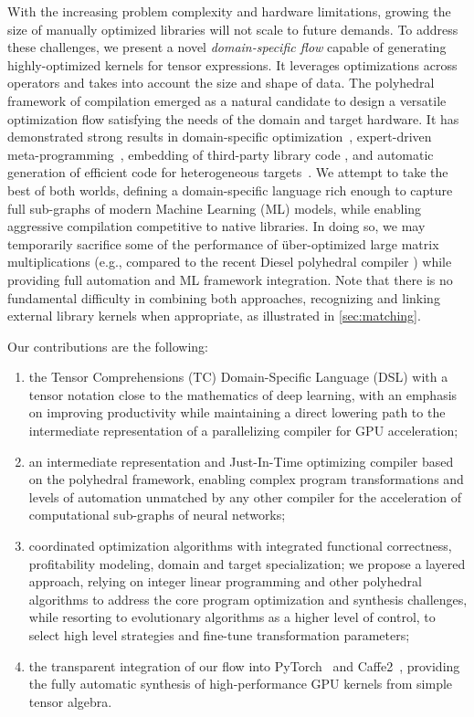 With the increasing problem complexity and hardware limitations,
growing the size of manually
optimized libraries will not scale to future demands.  To address
these challenges, we present a novel \emph{domain-specific flow}
capable of generating highly-optimized kernels for tensor
expressions. It leverages optimizations across operators and takes
into account the size and shape of data.  The polyhedral framework of
compilation emerged as a natural candidate to design a versatile
optimization flow satisfying the needs of the domain and target
hardware. It has demonstrated strong results in domain-specific
optimization~\cite{Polymage,VOBLA,Baghdadi2015Pencil,Elango:2018:DDL:3211346.3211354},
expert-driven meta-programming~\cite{URUK,CHiLL,Clay}, embedding of
third-party library code \cite{DBLP:conf/pldi/KongVSFPS13}, and
automatic generation of efficient code for heterogeneous
targets~\cite{PlutoGPU,RStream,PouchetFPGA,PPCG2013,Baghdadi2015Pencil,Zinenko2018Spatial}.
We attempt to take the best of both worlds, defining a domain-specific
language rich enough to capture full sub-graphs of modern
Machine Learning (ML) models,
while enabling aggressive compilation competitive to native
libraries. In doing so, we may temporarily sacrifice some of the
performance of über-optimized large matrix multiplications (e.g., compared
to the recent Diesel polyhedral compiler \cite{Elango:2018:DDL:3211346.3211354})
while providing full automation and ML framework integration.
Note that there is no fundamental difficulty in combining both approaches,
recognizing and
linking external library kernels when appropriate,
as illustrated in \autoref{sec:matching}.

Our contributions are the following:
\begin{enumerate}
\item the Tensor Comprehensions (TC) Domain-Specific Language (DSL)
  with a tensor notation close to the mathematics of deep learning,
  with an emphasis on improving productivity while maintaining a
  direct lowering path to the intermediate representation of a
  parallelizing compiler for GPU acceleration;
\item an intermediate representation and Just-In-Time optimizing
  compiler based on the polyhedral framework, enabling complex program
  transformations and levels of automation unmatched by any other
  compiler for the acceleration of computational sub-graphs of neural
  networks;
\item coordinated optimization algorithms with integrated functional
  correctness, profitability modeling, domain and target
  specialization; we propose a layered approach, relying on integer
  linear programming and other polyhedral algorithms to address the
  core program optimization and synthesis challenges, while resorting
  to evolutionary algorithms as a higher level of control, to select
  high level strategies and fine-tune transformation parameters;
\item the transparent integration of our flow into
  PyTorch~\cite{PyTorch} and Caffe2~\cite{Caffe2}, providing the fully
  automatic synthesis of high-performance GPU kernels from simple
  tensor algebra.
\end{enumerate}


